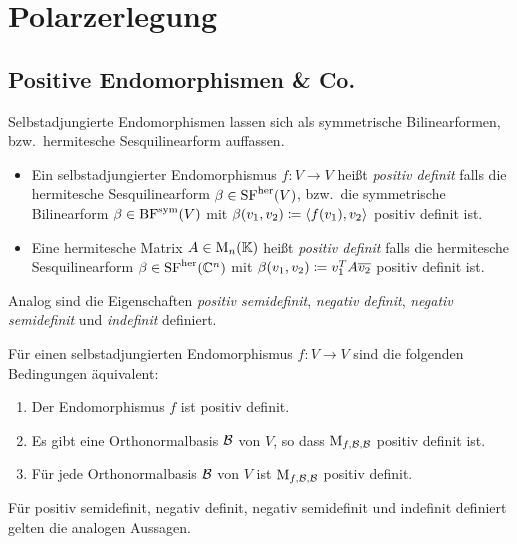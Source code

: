 \section{Polarzerlegung}



\subsection*{Positive Endomorphismen \& Co.}

Selbstadjungierte Endomorphismen lassen sich als symmetrische Bilinearformen, bzw.\ hermitesche Sesquilinearform auffassen.

\pagebreak

\begin{definition}
  \leavevmode
  \begin{itemize}
    \item
      Ein selbstadjungierter Endomorphismus $f \colon V \to V$ heißt \emph{positiv definit} falls die hermitesche Sesquilinearform $\beta \in \operatorname{SF}^{\operatorname{her}}(V)$, bzw.\ die symmetrische Bilinearform $\beta \in \operatorname{BF}^{\operatorname{sym}}(V)$ mit $\beta(v_1, v_2) \coloneqq \left\langle f(v_1), v_2 \right\rangle$ positiv definit ist.
    \item
      Eine hermitesche Matrix $A \in \operatorname{M}_{n}(\mathbb{K})$ heißt \emph{positiv definit} falls die hermitesche Sesquilinearform $\beta \in \operatorname{SF}^{\operatorname{her}}(\mathbb{C}^n)$ mit $\beta(v_1, v_2) \coloneqq v_1^T A \overline{v_2}$ positiv definit ist.
  \end{itemize}
  
  Analog sind die Eigenschaften \emph{positiv semidefinit}, \emph{negativ definit}, \emph{negativ semidefinit} und \emph{indefinit} definiert.
\end{definition}

\begin{definition}
  Für einen selbstadjungierten Endomorphismus $f \colon V \to V$ sind die folgenden Bedingungen äquivalent:
  \begin{enumerate}
    \item
      Der Endomorphismus $f$ ist positiv definit.
    \item
      Es gibt eine Orthonormalbasis $\mathcal{B}$ von $V$, so dass $\operatorname{M}_{f, \mathcal{B}, \mathcal{B}}$ positiv definit ist.
    \item
      Für jede Orthonormalbasis $\mathcal{B}$ von $V$ ist $\operatorname{M}_{f, \mathcal{B}, \mathcal{B}}$ positiv definit.
  \end{enumerate}
  Für positiv semidefinit, negativ definit, negativ semidefinit und indefinit definiert gelten die analogen Aussagen.
\end{definition}

